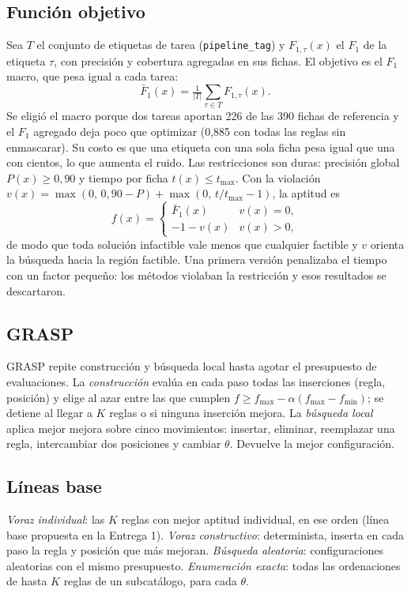 \documentclass[conference]{IEEEtran}
\begin{document}
	\subsection{Funci\'on objetivo}
	Sea $T$ el conjunto de etiquetas de tarea (\texttt{pipeline\_tag}) y $F_{1,\tau}(x)$ el $F_1$ de la etiqueta $\tau$, con precisi\'on y cobertura agregadas en sus fichas. El objetivo es el $F_1$ macro, que pesa igual a cada tarea:
	\begin{equation}
		\bar F_1(x)=\tfrac{1}{|T|}\textstyle\sum_{\tau\in T}F_{1,\tau}(x).
	\end{equation}
	Se eligi\'o el macro porque dos tareas aportan 226 de las 390 fichas de referencia y el $F_1$ agregado deja poco que optimizar (0,885 con todas las reglas sin enmascarar). Su costo es que una etiqueta con una sola ficha pesa igual que una con cientos, lo que aumenta el ruido. Las restricciones son duras: precisi\'on global $P(x)\ge0{,}90$ y tiempo por ficha $t(x)\le t_{\max}$. Con la violaci\'on $v(x)=\max(0,\,0{,}90-P)+\max(0,\,t/t_{\max}-1)$, la aptitud es
	\begin{equation}
		f(x)=\begin{cases}\bar F_1(x) & v(x)=0,\\ -1-v(x) & v(x)>0,\end{cases}
	\end{equation}
	de modo que toda soluci\'on infactible vale menos que cualquier factible y $v$ orienta la b\'usqueda hacia la regi\'on factible. Una primera versi\'on penalizaba el tiempo con un factor peque\~no: los m\'etodos violaban la restricci\'on y esos resultados se descartaron.
	
	\subsection{GRASP}
	GRASP \cite{feo} repite construcci\'on y b\'usqueda local hasta agotar el presupuesto de evaluaciones. La \emph{construcci\'on} eval\'ua en cada paso todas las inserciones (regla, posici\'on) y elige al azar entre las que cumplen $f\ge f_{\max}-\alpha(f_{\max}-f_{\min})$; se detiene al llegar a $K$ reglas o si ninguna inserci\'on mejora. La \emph{b\'usqueda local} aplica mejor mejora sobre cinco movimientos: insertar, eliminar, reemplazar una regla, intercambiar dos posiciones y cambiar $\theta$. Devuelve la mejor configuraci\'on.
	
	\subsection{L\'ineas base}
	\emph{Voraz individual}: las $K$ reglas con mejor aptitud individual, en ese orden (l\'inea base propuesta en la Entrega 1). \emph{Voraz constructivo}: determinista, inserta en cada paso la regla y posici\'on que m\'as mejoran. \emph{B\'usqueda aleatoria}: configuraciones aleatorias con el mismo presupuesto. \emph{Enumeraci\'on exacta}: todas las ordenaciones de hasta $K$ reglas de un subcat\'alogo, para cada $\theta$.
	
\end{document}
